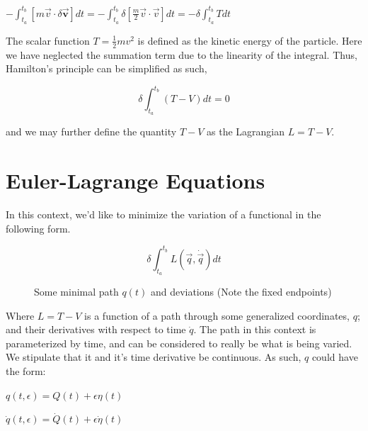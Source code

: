 \documentclass{article}\usepackage[]{graphicx}\usepackage[]{color}
\begin{document}
\begin{center}

$-\int_{t_a}^{t_b}[m\vec{v}\cdot\delta\vec{\textbf{v}}]dt=-\int_{t_a}^{t_b}\delta\left[ \frac{m}{2}\vec{v}\cdot\vec{v}\right] dt
=-\delta\int_{t_a}^{t_b}Tdt$

\end{center}

The scalar function $T=\frac{1}{2}mv^2$ is defined as the kinetic energy of the particle. Here we have neglected the summation term due to the linearity of the integral. Thus, Hamilton's principle can be simplified as such,

\begin{equation}
\delta\int_{t_a}^{t_b}(T-V)dt=0
\end{equation}

and we may further define the quantity $T-V$ as the Lagrangian $L=T-V$.

\section{Euler-Lagrange Equations}

In this context, we'd like to minimize the variation of a functional in the following form.

\begin{equation}
\delta\int^{t_b}_{t_a}L(\vec{q},\dot{\vec{q}})dt 
\end{equation}   

\begin{center}

\begin{figure}

\caption{Some minimal path $q(t)$ and deviations (Note the fixed endpoints)}
\end{figure}

\end{center}

Where $L=T-V$ is a function of a path through some generalized coordinates, $q$; and their derivatives with respect to time $\dot{q}$. The path in this context is parameterized by time, and can be considered to really be what is being varied. We stipulate that it and it's time derivative be continuous. As such, $q$ could have the form:

\begin{center}
$q(t,\epsilon)=Q(t)+\epsilon\eta(t)$

$\dot{q}(t,\epsilon)=\dot{Q}(t)+\epsilon\dot{\eta}(t)$


\end{center}
\end{document}
